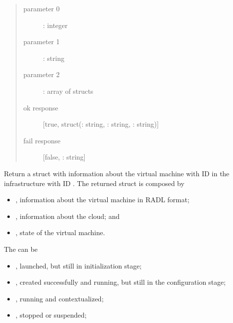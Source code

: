 \documentclass[letterpaper,10pt,english]{sphinxmanual}
\begin{document}
\label{xmlrpc:getvminfo-xmlrpc}\begin{description}
\item[{}] \leavevmode\begin{quote}\begin{description}
\item[{parameter 0}] \leavevmode
{}: integer

\item[{parameter 1}] \leavevmode
{}: string

\item[{parameter 2}] \leavevmode
{}: array of structs

\item[{ok response}] \leavevmode
{[}true, struct(: string, : string, : string){]}

\item[{fail response}] \leavevmode
{[}false, : string{]}

\end{description}\end{quote}

Return a struct with information about the virtual machine with ID 
in the infrastructure with ID . The returned struct is composed by
\begin{itemize}
\item {} 
, information about the virtual machine in RADL format;

\item {} 
, information about the cloud; and

\item {} 
, state of the virtual machine.

\end{itemize}

The  can be
\begin{itemize}
\item {} 
, launched, but still in initialization stage;

\item {} 
, created successfully and running, but still in the configuration stage;

\item {} 
, running and contextualized;

\item {} 
, stopped or suspended;


\end{itemize}
\end{description}
\end{document}
